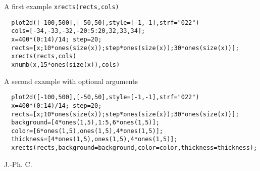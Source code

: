 \begin{examples}

A first example \verb!xrects(rects,cols)!

\begin{Verbatim}
  plot2d([-100,500],[-50,50],style=[-1,-1],strf="022")
  cols=[-34,-33,-32,-20:5:20,32,33,34];
  x=400*(0:14)/14; step=20;
  rects=[x;10*ones(size(x));step*ones(size(x));30*ones(size(x))];
  xrects(rects,cols)
  xnumb(x,15*ones(size(x)),cols)
\end{Verbatim}

A second example with optional arguments

\begin{Verbatim}
  plot2d([-100,500],[-50,50],style=[-1,-1],strf="022")
  x=400*(0:14)/14; step=20;
  rects=[x;10*ones(size(x));step*ones(size(x));30*ones(size(x))];
  background=[4*ones(1,5),1:5,6*ones(1,5)];
  color=[6*ones(1,5),ones(1,5),4*ones(1,5)];
  thickness=[4*ones(1,5),ones(1,5),4*ones(1,5)];
  xrects(rects,background=background,color=color,thickness=thickness);
\end{Verbatim}

\end{examples}

\begin{manseealso}
   
\end{manseealso}


\begin{authors}
  J.-Ph. C.
\end{authors}
